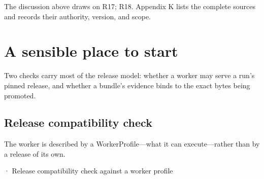 The discussion above draws on R17; R18. Appendix K lists the complete sources and records their authority, version, and scope.\par

\section{A sensible place to start}

Two checks carry most of the release model: whether a worker may serve a run's pinned release, and whether a bundle's evidence binds to the exact bytes being promoted.\par

\subsection{Release compatibility check}

The worker is described by a WorkerProfile—what it can execute—rather than by a release of its own.\par

\BookSnake · Release compatibility check against a worker profile\par

